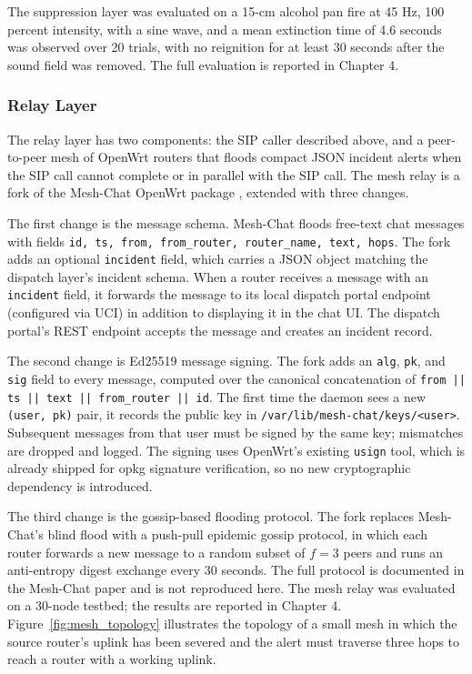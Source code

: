 The suppression layer was evaluated on a 15-cm alcohol pan fire at 45 Hz, 100 percent intensity, with a sine wave, and a mean extinction time of 4.6 seconds was observed over 20 trials, with no reignition for at least 30 seconds after the sound field was removed. The full evaluation is reported in Chapter 4.

\subsubsection{Relay Layer}

The relay layer has two components: the SIP caller described above, and a peer-to-peer mesh of OpenWrt routers that floods compact JSON incident alerts when the SIP call cannot complete or in parallel with the SIP call. The mesh relay is a fork of the Mesh-Chat OpenWrt package \cite{meshchat2026}, extended with three changes.

The first change is the message schema. Mesh-Chat floods free-text chat messages with fields \texttt{id, ts, from, from\_router, router\_name, text, hops}. The fork adds an optional \texttt{incident} field, which carries a JSON object matching the dispatch layer's incident schema. When a router receives a message with an \texttt{incident} field, it forwards the message to its local dispatch portal endpoint (configured via UCI) in addition to displaying it in the chat UI. The dispatch portal's REST endpoint accepts the message and creates an incident record.

The second change is Ed25519 message signing. The fork adds an \texttt{alg}, \texttt{pk}, and \texttt{sig} field to every message, computed over the canonical concatenation of \texttt{from || ts || text || from\_router || id}. The first time the daemon sees a new \texttt{(user, pk)} pair, it records the public key in \texttt{/var/lib/mesh-chat/keys/<user>}. Subsequent messages from that user must be signed by the same key; mismatches are dropped and logged. The signing uses OpenWrt's existing \texttt{usign} tool, which is already shipped for opkg signature verification, so no new cryptographic dependency is introduced.

The third change is the gossip-based flooding protocol. The fork replaces Mesh-Chat's blind flood with a push-pull epidemic gossip protocol, in which each router forwards a new message to a random subset of $f=3$ peers and runs an anti-entropy digest exchange every 30 seconds. The full protocol is documented in the Mesh-Chat paper and is not reproduced here. The mesh relay was evaluated on a 30-node testbed; the results are reported in Chapter 4. Figure~\ref{fig:mesh_topology} illustrates the topology of a small mesh in which the source router's uplink has been severed and the alert must traverse three hops to reach a router with a working uplink.

